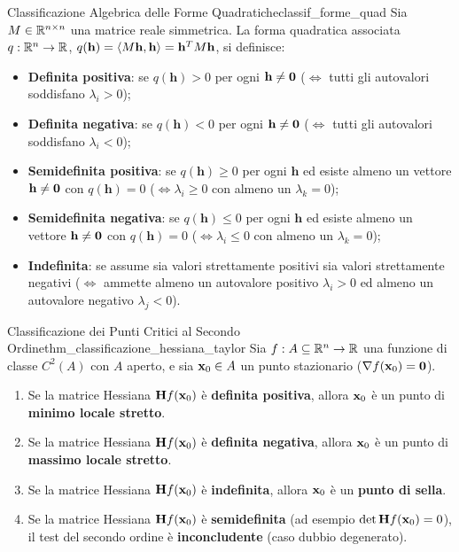 \begin{definizione}{Classificazione Algebrica delle Forme Quadratiche}{classif_forme_quad}
Sia $M \in \mathbb{R}^{n \times n}$ una matrice reale simmetrica. La forma quadratica associata $q: \mathbb{R}^n \to \mathbb{R}$, $q(\mathbf{h}) = \langle M\mathbf{h}, \mathbf{h}\rangle = \mathbf{h}^T M \mathbf{h}$, si definisce:
\begin{itemize}
    \item \textbf{Definita positiva}: se $q(\mathbf{h}) > 0$ per ogni $\mathbf{h} \neq \mathbf{0}$ ($\iff$ tutti gli autovalori soddisfano $\lambda_i > 0$);
    \item \textbf{Definita negativa}: se $q(\mathbf{h}) < 0$ per ogni $\mathbf{h} \neq \mathbf{0}$ ($\iff$ tutti gli autovalori soddisfano $\lambda_i < 0$);
    \item \textbf{Semidefinita positiva}: se $q(\mathbf{h}) \ge 0$ per ogni $\mathbf{h}$ ed esiste almeno un vettore $\mathbf{h} \neq \mathbf{0}$ con $q(\mathbf{h}) = 0$ ($\iff \lambda_i \ge 0$ con almeno un $\lambda_k = 0$);
    \item \textbf{Semidefinita negativa}: se $q(\mathbf{h}) \le 0$ per ogni $\mathbf{h}$ ed esiste almeno un vettore $\mathbf{h} \neq \mathbf{0}$ con $q(\mathbf{h}) = 0$ ($\iff \lambda_i \le 0$ con almeno un $\lambda_k = 0$);
    \item \textbf{Indefinita}: se assume sia valori strettamente positivi sia valori strettamente negativi ($\iff$ ammette almeno un autovalore positivo $\lambda_i > 0$ ed almeno un autovalore negativo $\lambda_j < 0$).
\end{itemize}
\end{definizione}

\begin{teorema}{Classificazione dei Punti Critici al Secondo Ordine}{thm_classificazione_hessiana_taylor}
Sia $f: A \subseteq \mathbb{R}^n \to \mathbb{R}$ una funzione di classe $C^2(A)$ con $A$ aperto, e sia $\mathbf{x}_0 \in A$ un punto stazionario ($\nabla f(\mathbf{x}_0) = \mathbf{0}$).
\begin{enumerate}
    \item Se la matrice Hessiana $\mathbf{H} f(\mathbf{x}_0)$ è \textbf{definita positiva}, allora $\mathbf{x}_0$ è un punto di \textbf{minimo locale stretto}.
    \item Se la matrice Hessiana $\mathbf{H} f(\mathbf{x}_0)$ è \textbf{definita negativa}, allora $\mathbf{x}_0$ è un punto di \textbf{massimo locale stretto}.
    \item Se la matrice Hessiana $\mathbf{H} f(\mathbf{x}_0)$ è \textbf{indefinita}, allora $\mathbf{x}_0$ è un \textbf{punto di sella}.
    \item Se la matrice Hessiana $\mathbf{H} f(\mathbf{x}_0)$ è \textbf{semidefinita} (ad esempio $\det \mathbf{H} f(\mathbf{x}_0) = 0$), il test del secondo ordine è \textbf{inconcludente} (caso dubbio degenerato).
\end{enumerate}
\end{teorema}

